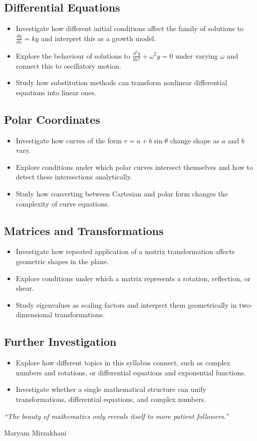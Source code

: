 \documentclass[12pt, a4paper]{book}
\begin{document}
\subsection*{Differential Equations}
\begin{itemize}
\item Investigate how different initial conditions affect the family of solutions to $\frac{dy}{dx} = ky$ and interpret this as a growth model.
\item Explore the behaviour of solutions to $\frac{d^2y}{dx^2} + \omega^2 y = 0$ under varying $\omega$ and connect this to oscillatory motion.
\item Study how substitution methods can transform nonlinear differential equations into linear ones.
\end{itemize}

\subsection*{Polar Coordinates}
\begin{itemize}
\item Investigate how curves of the form $r = a + b \sin \theta$ change shape as $a$ and $b$ vary.
\item Explore conditions under which polar curves intersect themselves and how to detect these intersections analytically.
\item Study how converting between Cartesian and polar form changes the complexity of curve equations.
\end{itemize}

\subsection*{Matrices and Transformations}
\begin{itemize}
\item Investigate how repeated application of a matrix transformation affects geometric shapes in the plane.
\item Explore conditions under which a matrix represents a rotation, reflection, or shear.
\item Study eigenvalues as scaling factors and interpret them geometrically in two-dimensional transformations.
\end{itemize}

\subsection*{Further Investigation}
\begin{itemize}
\item Explore how different topics in this syllabus connect, such as complex numbers and rotations, or differential equations and exponential functions.
\item Investigate whether a single mathematical structure can unify transformations, differential equations, and complex numbers.
\end{itemize}

\vspace*{\fill}
\hrulefill
\begin{center}
\textit{“The beauty of mathematics only reveals itself to more patient followers.”}

Maryam Mirzakhani
\end{center}

\vspace*{\fill}
\end{document}
